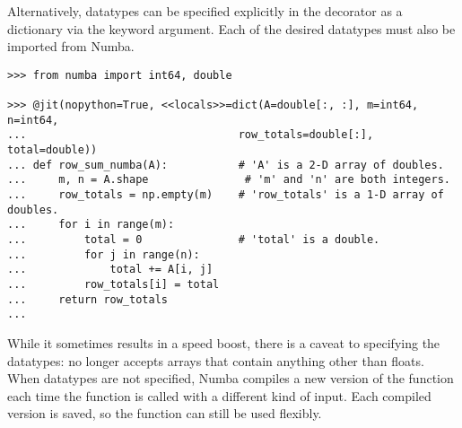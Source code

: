Alternatively, datatypes can be specified explicitly in the  decorator as a dictionary via the  keyword argument.
Each of the desired datatypes must also be imported from Numba.

\begin{lstlisting}
>>> from numba import int64, double

>>> @jit(nopython=True, <<locals>>=dict(A=double[:, :], m=int64, n=int64,
...                                 row_totals=double[:], total=double))
... def row_sum_numba(A):           # 'A' is a 2-D array of doubles.
...     m, n = A.shape               # 'm' and 'n' are both integers.
...     row_totals = np.empty(m)    # 'row_totals' is a 1-D array of doubles.
...     for i in range(m):
...         total = 0               # 'total' is a double.
...         for j in range(n):
...             total += A[i, j]
...         row_totals[i] = total
...     return row_totals
...
\end{lstlisting}

While it sometimes results in a speed boost, there is a caveat to specifying the datatypes:  no longer accepts arrays that contain anything other than floats.
When datatypes are not specified, Numba compiles a new version of the function each time the function is called with a different kind of input.
Each compiled version is saved, so the function can still be used flexibly.

